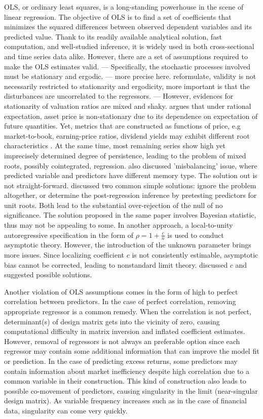 \documentclass[12pt,a4paper]{article}
\begin{document}
OLS, or ordinary least squares, is a long-standing powerhouse in the scene of linear regression. The objective of OLS is to find a set of coefficients that minimizes the squared differences between observed dependent variables and its predicted value. Thank to its readily available analytical solution, fast computation, and well-studied inference, it is widely used in both cross-sectional and time series data alike. However, there are a set of assumptions required to make the OLS estimates valid.
--- Specifically, the stochastic processes involved must be stationary and ergodic. --- more precise here. reformulate, validity is not necessarily restricted to stationarity and ergodicity, more important is that the disturbances are uncorrelated to the regressors. ---
However, evidences for stationarity of valuation ratios are mixed and shaky. \cite{roll2002rational} argues that under rational expectation, asset price is non-stationary due to its dependence on expectation of future quantities. Yet, metrics that are constructed as functions of price, e.g market-to-book, earning-price ratios, dividend yields may exhibit different root characteristics \citep{phillips2015halbert}. At the same time, most remaining series show high yet imprecisely determined degree of persistence, leading to the problem of mixed roots, possibly cointegrated, regression. \cite{phillips2015halbert} also discussed 'misbalancing' issue, where predicted variable and predictors have different memory type. The solution out is not straight-forward. \cite{elliott1994inference} discussed two common simple solutions: ignore the problem altogether, or determine the post-regression inference by pretesting predictors for unit roots. Both lead to the substantial over-rejection of the null of no significance. The solution proposed in the same paper involves Bayesian statistic, thus may not be appealing to some. In another approach, a local-to-unity autoregressive specification in the form of $ \rho = 1 + \frac{c}{n} $ is used to conduct asymptotic theory. However, the introduction of the unknown parameter brings more issues. Since localizing coefficient $c$ is not consistently estimable, asymptotic bias cannot be corrected, leading to nonstandard limit theory. \cite{phillips2013predictive} discussed $c$ and suggested possible solutions.

Another violation of OLS assumptions comes in the form of high to perfect correlation between predictors. In the case of perfect correlation, removing appropriate regressor is a common remedy. When the correlation is not perfect, determinant(s) of design matrix gets into the vicinity of zero, causing computational difficulty in matrix inversion and inflated coefficient estimates. However, removal of regressors is not always an preferable option since each regressor may contain some additional information that can improve the model fit or prediction. In the case of predicting excess returns, some predictors may contain information about market inefficiency despite high correlation due to a common variable in their construction. This kind of construction also leads to possible co-movement of predictors, causing singularity in the limit (near-singular design matrix). As variable frequency increases such as in the case of financial data, singularity can come very quickly.
\end{document}
